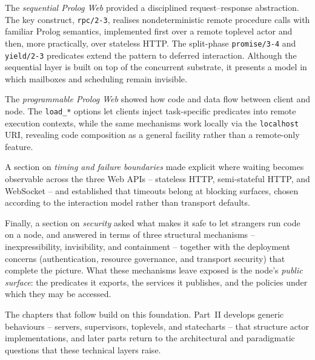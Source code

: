 The \emph{sequential Prolog Web} provided a disciplined
request--response abstraction. The key construct, \texttt{rpc/2-3},
realises nondeterministic remote procedure calls with familiar Prolog
semantics, implemented first over a remote toplevel actor and then,
more practically, over stateless HTTP. The split-phase
\texttt{promise/3-4} and \texttt{yield/2-3} predicates extend the
pattern to deferred interaction. Although the sequential layer is
built on top of the concurrent substrate, it presents a model in
which mailboxes and scheduling remain invisible.

The \emph{programmable Prolog Web} showed how code and data flow
between client and node. The \texttt{load\_*} options let clients
inject task-specific predicates into remote execution contexts, while
the same mechanisms work locally via the \texttt{localhost} URI,
revealing code composition as a general facility rather than a
remote-only feature.

A section on \emph{timing and failure boundaries} made explicit
where waiting becomes observable across the three Web APIs --
stateless HTTP, semi-stateful HTTP, and WebSocket -- and established
that timeouts belong at blocking surfaces, chosen according to the
interaction model rather than transport defaults.

Finally, a section on \emph{security} asked what makes it safe to
let strangers run code on a node, and answered in terms of three
structural mechanisms -- inexpressibility, invisibility, and
containment -- together with the deployment concerns (authentication,
resource governance, and transport security) that complete the
picture. What these mechanisms leave exposed is the node's
\emph{public surface}: the predicates it exports, the services it
publishes, and the policies under which they may be accessed.

The chapters that follow build on this foundation. Part~II develops
generic behaviours -- servers, supervisors, toplevels, and
statecharts -- that structure actor implementations, and later parts
return to the architectural and paradigmatic questions that these
technical layers raise.



